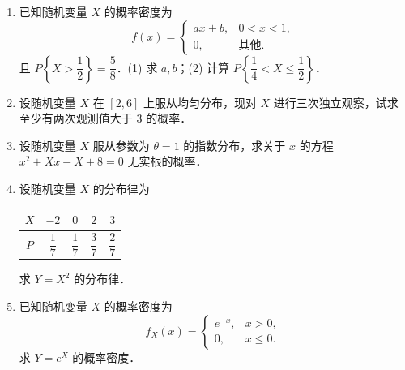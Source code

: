 \begin{enumerate}
	\vspace{5cm}
	
	\item 已知随机变量 $X$ 的概率密度为
	\[
	f(x) = \begin{cases}
		ax + b, & 0 < x < 1, \\
		0, & \text{其他}.
	\end{cases}
	\]
	且 $P\left\{X > \dfrac{1}{2}\right\} = \dfrac{5}{8}$．(1) 求 $a, b$；(2) 计算 $P\left\{\dfrac{1}{4} < X \le \dfrac{1}{2}\right\}$．
	
	\vspace{5cm}
	
	\item 设随机变量 $X$ 在 $[2, 6]$ 上服从均匀分布，现对 $X$ 进行三次独立观察，试求至少有两次观测值大于 $3$ 的概率．
	
	\vspace{5cm}
	
	\item 设随机变量 $X$ 服从参数为 $\theta = 1$ 的指数分布，求关于 $x$ 的方程 $x^2 + Xx - X + 8 = 0$ 无实根的概率．
	
	\vspace{5cm}
	
	\item 设随机变量 $X$ 的分布律为
	\begin{center}
		\begin{tabular}{c|cccc}
			$X$ & $-2$ & $0$ & $2$ & $3$ \\ \hline
			$P$ & $\dfrac{1}{7}$ & $\dfrac{1}{7}$ & $\dfrac{3}{7}$ & $\dfrac{2}{7}$
		\end{tabular}
	\end{center}
	求 $Y = X^2$ 的分布律．
	
	\vspace{5cm}
	
	\item 已知随机变量 $X$ 的概率密度为
	\[
	f_X(x) = \begin{cases}
		e^{-x}, & x > 0, \\
		0, & x \le 0.
	\end{cases}
	\]
	求 $Y = e^X$ 的概率密度．
	
\end{enumerate}


























